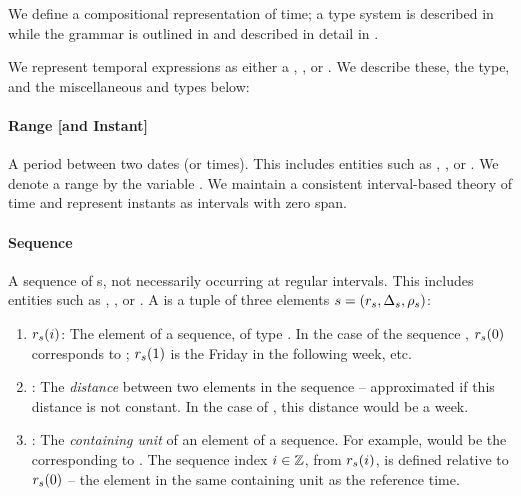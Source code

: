 We define a compositional representation of time; a type system 
	is described in  while the grammar is outlined in
	 and described in detail in 
	.

We represent temporal expressions as either a , ,
	or .
We describe these, the  type, and the miscellaneous
	 and  types below:
\paragraph{Range [and Instant]}
A period between two dates (or times).
This includes entities such as , , or
	.
We denote a range by the variable \range.
We maintain a consistent interval-based theory of time
	\cite{key:1981allen-temporal} and represent instants as intervals with
	zero span.

\paragraph{Sequence}
A sequence of s, not necessarily occurring at regular intervals.
This includes entities such as , , or
	.
A  is a tuple of three elements
	$s=(r_s,\Delta_s,\rho_s)$:
\begin{enumerate}
	\setlength{\itemsep}{-5pt} 
	\item $r_s(i)$: 
		The  element of a sequence, of type .
		In the case of the sequence , $r_s(0)$ corresponds to
			; 
			$r_s(1)$ is the Friday in the following week, etc.
	\item \seqjump:
		The \textit{distance} between two elements in the sequence -- approximated
			if this distance is not constant.
		In the case of , this distance would be a week.
	\item \seqcanon:
		The \textit{containing unit} of an element of a sequence.
		For example,  would be the 
			corresponding to .
		The sequence index $i \in \mathbb{Z}$, from $r_s(i)$, is defined relative to $r_s(0)$ --
			the element in the same containing unit as the reference time.
\end{enumerate}

